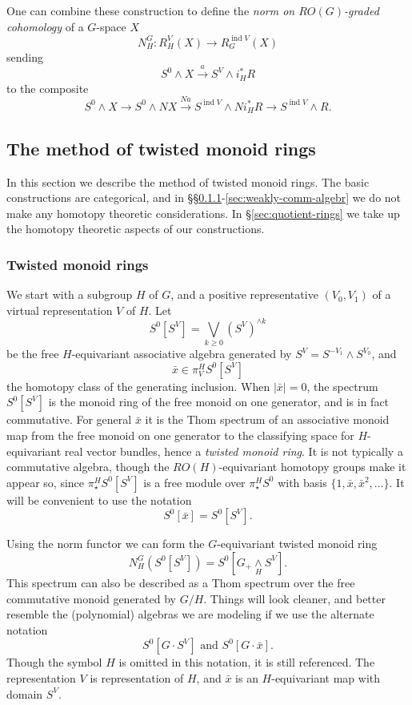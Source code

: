 \documentclass{amsart}
\theoremstyle{definition}
\theoremstyle{remark}
\newcommand{\smashove}[1]{\underset{#1}{\wedge}}
\newcommand{\norm}{N}
\DeclareMathOperator{\ind}{ind}
\newcommand{\gbar}{\bar}
\begin{document}
One can combine these construction to define the {\em norm
on $RO(G)$-graded cohomology} of a $G$-space $X$
\[
\norm_{H}^{G}: R^{V}_{H}(X)\to R^{\ind V}_{G}(X)
\]
sending
\[
S^{0}\wedge X \xrightarrow{a}{} S^{V}\wedge i_{H}^{\ast}R
\]
to the composite
\[
S^{0}\wedge X\xrightarrow{}{} S^{0}\wedge \norm X \xrightarrow{\norm a}{} S^{\ind V}\wedge
\norm i_{H}^{\ast}R \to S^{\ind V}\wedge R.
\]


\subsection{The method of twisted monoid rings}
\label{sec:meth-poly-algebr}

In this section we describe the method of twisted monoid rings.   The
basic constructions are categorical, and in
\S\S\ref{sec:polynomial-algebras}-\ref{sec:weakly-comm-algebr} we do
not make any homotopy theoretic considerations.   In
\S\ref{sec:quotient-rings} we take up the homotopy theoretic aspects
of our constructions.   


\subsubsection{Twisted monoid rings}
\label{sec:polynomial-algebras}

We start with a subgroup $H$ of $G$, and a positive representative
$(V_{0},V_{1})$ of a virtual representation $V$ of $H$.  Let
\[
S^{0}[S^{V}] = \bigvee_{k\ge 0} (S^{V})^{\wedge k}
\]
be the free $H$-equivariant associative algebra generated by $S^{V}=
S^{-V_{1}}\wedge S^{V_{0}}$, and
\[
\gbar{x} \in \pi^{H}_{V}S^{0}[S^{V}]
\]
the homotopy class of the generating inclusion.  When $|\gbar{x}|=0$,
the spectrum $S^{0}[S^{V}]$ is the monoid ring of the free monoid on
one generator, and is in fact commutative.  For general $\gbar{x}$ it
is the Thom spectrum of an associative monoid map from the free monoid
on one generator to the classifying space for $H$-equivariant real
vector bundles, hence a {\em twisted monoid ring}.  It
is not typically a commutative algebra, though the
$RO(H)$-equivariant homotopy groups make it appear so, since
$\pi^{H}_{\star}S^{0}[S^{V}]$ is a free module over
$\pi^{H}_{\star}S^{0}$ with basis $\{1,\gbar x, \gbar x^{2},\dots \}$.
It will be convenient to use the notation
\[
S^{0}[\gbar{x}] = S^{0}[S^{V}].
\]

Using the norm functor we can form the $G$-equivariant
twisted monoid ring
\[
\norm_{H}^{G}
(S^{0}[S^{V}]) = S^{0}[G_{+}\smashove{H}S^{V}].
\]
This spectrum can also be described as a Thom spectrum over the free
commutative monoid generated by $G/H$.  Things will look cleaner, and
better resemble the (polynomial) algebras we are modeling if we use
the alternate notation
\[
S^{0}[G\cdot S^{V}] \text{ and } S^{0}[G\cdot\gbar{x}].
\]
Though the symbol $H$ is omitted in this notation, it is still
referenced.  The representation $V$ is representation of $H$, and
$\gbar{x}$ is an $H$-equivariant map with domain $S^{V}$.
\end{document}
